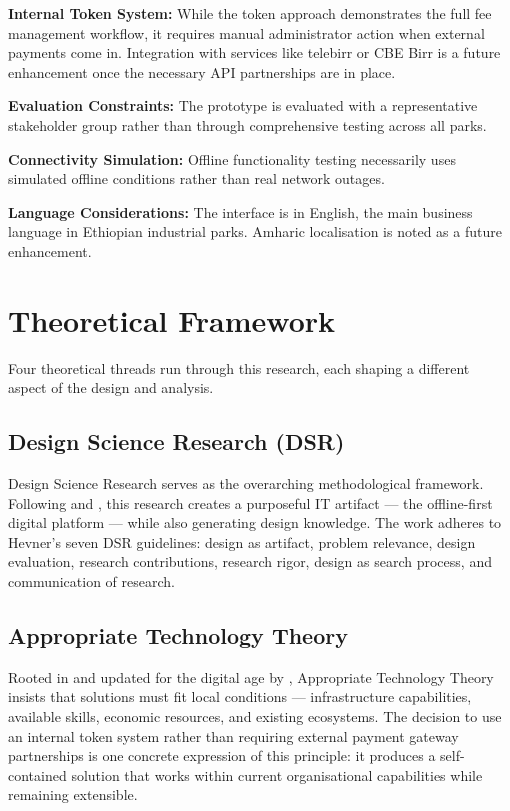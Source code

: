 \textbf{Internal Token System:} While the token approach demonstrates the full fee management workflow, it requires manual administrator action when external payments come in. Integration with services like telebirr or CBE Birr is a future enhancement once the necessary API partnerships are in place.

\textbf{Evaluation Constraints:} The prototype is evaluated with a representative stakeholder group rather than through comprehensive testing across all parks.

\textbf{Connectivity Simulation:} Offline functionality testing necessarily uses simulated offline conditions rather than real network outages.

\textbf{Language Considerations:} The interface is in English, the main business language in Ethiopian industrial parks. Amharic localisation is noted as a future enhancement.

\section{Theoretical Framework}

Four theoretical threads run through this research, each shaping a different aspect of the design and analysis.

\subsection{Design Science Research (DSR)}

Design Science Research serves as the overarching methodological framework. Following \citet{Hevner2004} and \citet{Peffers2007}, this research creates a purposeful IT artifact --- the offline-first digital platform --- while also generating design knowledge. The work adheres to Hevner's seven DSR guidelines: design as artifact, problem relevance, design evaluation, research contributions, research rigor, design as search process, and communication of research.

\subsection{Appropriate Technology Theory}

Rooted in \citet{Schumacher1973} and updated for the digital age by \citet{Toyama2015}, Appropriate Technology Theory insists that solutions must fit local conditions — infrastructure capabilities, available skills, economic resources, and existing ecosystems. The decision to use an internal token system rather than requiring external payment gateway partnerships is one concrete expression of this principle: it produces a self-contained solution that works within current organisational capabilities while remaining extensible.

